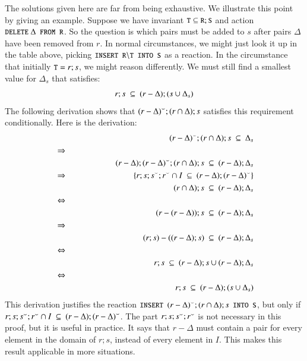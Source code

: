 \documentclass{elsarticle}
\begin{document}
	The solutions given here are far from being exhaustive.
	We illustrate this point by giving an example.
	Suppose we have invariant $\text{\tt\small T}\subseteq\text{\tt\small R};\text{\tt\small S}$ and action $\code{DELETE}\ \Delta\code{ FROM R}$.
	So the question is which pairs must be added to $s$ after pairs $\Delta$ have been removed from $r$.
	In normal circumstances, we might just look it up in the table above, picking $\text{\tt\small INSERT R}\backslash\text{\tt\small T INTO S}$ as a reaction.
	In the circumstance that initially $\text{\tt\small T}=r;s$, we might reason differently.
	We must still find a smallest value for $\Delta_s$ that satisfies:
\begin{equation}
r;s\ \subs\ (r-\Delta);(s\cup\Delta_s)\label{lbl:nonshrinking r;s when Del from r}
\end{equation}
	The following derivation shows that ${(r-\Delta)}^\smallsmile;(r\cap\Delta);s$ satisfies this requirement conditionally.
	Here is the derivation:
\begin{eqnarray}
&&\flip{(r-\Delta)};(r\cap\Delta);s\ \subs\ \Delta_s\nonumber\\
&\Rightarrow\nonumber\\
&&(r-\Delta);\flip{(r-\Delta)};(r\cap\Delta);s\ \subs\ (r-\Delta);\Delta_s\nonumber\\
&\Rightarrow&\hspace{1in}\{r;s;\flip{s};\flip{r} \cap\iden\ \ \subs\ (r-\Delta);\flip{(r-\Delta)}\}\nonumber\\
&&(r\cap\Delta);s\ \subs\ (r-\Delta);\Delta_s\nonumber\\
&\Leftrightarrow\nonumber\\
&&(r-(r-\Delta));s\ \subs\ (r-\Delta);\Delta_s\nonumber\\
&\Rightarrow\nonumber\\
&&(r;s)-((r-\Delta);s)\ \subs\ (r-\Delta);\Delta_s\nonumber\\
&\Leftrightarrow\nonumber\\
&&r;s\ \subs\ (r-\Delta);s \cup (r-\Delta);\Delta_s\nonumber\\
&\Leftrightarrow\nonumber\\
&&r;s\ \subs\ (r-\Delta);(s \cup \Delta_s)\nonumber
\end{eqnarray}
	This derivation justifies the reaction $\code{INSERT }\flip{(r-\Delta)};(r\cap\Delta);s\code{ INTO S}$,
	but only if $r;s;\flip{s};\flip{r} \cap\iden\ \ \subs\ (r-\Delta);\flip{(r-\Delta)}$.
	The part $r;s;{s}^\smallsmile;{r}^\smallsmile$ is not necessary in this proof, but it is useful in practice.
	It says that $r-\Delta$ must contain a pair for every element in the domain of $r;s$,
	instead of every element in $I$.
	This makes this result applicable in more situations.
\end{document}

